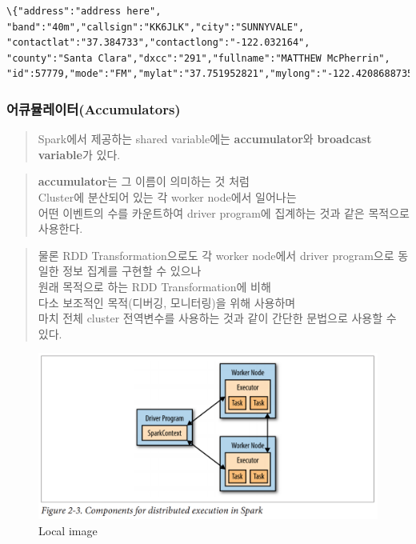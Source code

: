 \documentclass[11pt]{article}
\makeatletter
\def\maxwidth{\ifdim\Gin@nat@width>\linewidth\linewidth
    \else\Gin@nat@width\fi}
\let\Oldincludegraphics\includegraphics
\renewcommand{\includegraphics}[1]{\Oldincludegraphics[width=.8\maxwidth]{#1}}
\makeatother
\begin{document}
    \begin{Verbatim}[commandchars=\\\{\}]
\{"address":"address here", "band":"40m","callsign":"KK6JLK","city":"SUNNYVALE",
"contactlat":"37.384733","contactlong":"-122.032164",
"county":"Santa Clara","dxcc":"291","fullname":"MATTHEW McPherrin",
"id":57779,"mode":"FM","mylat":"37.751952821","mylong":"-122.4208688735"\}
    \end{Verbatim}

    \subsubsection{어큐뮬레이터(Accumulators)}\label{uxc5b4uxd050uxbbacuxb808uxc774uxd130accumulators}

    \begin{quote}
Spark에서 제공하는 shared variable에는 \textbf{accumulator}와
\textbf{broadcast variable}가 있다.
\end{quote}

\begin{quote}
\textbf{accumulator}는 그 이름이 의미하는 것 처럼\\Cluster에 분산되어
있는 각 worker node에서 일어나는\\어떤 이벤트의 수를 카운트하여 driver
program에 집계하는 것과 같은 목적으로 사용한다.
\end{quote}

\begin{quote}
물론 RDD Transformation으로도 각 worker node에서 driver program으로
동일한 정보 집계를 구현할 수 있으나\\원래 목적으로 하는 RDD
Transformation에 비해\\다소 보조적인 목적(디버깅, 모니터링)을 위해
사용하며\\마치 전체 cluster 전역변수를 사용하는 것과 같이 간단한
문법으로 사용할 수 있다.
\end{quote}

    \begin{figure}[htbp]
\centering
\includegraphics{./_images/figure_2_3.PNG}
\caption{Local image}
\end{figure}
\end{document}
